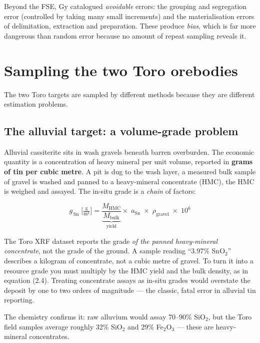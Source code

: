 \documentclass[11pt]{article}
\begin{document}
Beyond the FSE, Gy catalogued \emph{avoidable} errors: the grouping and
segregation error (controlled by taking many small increments) and the
materialisation errors of delimitation, extraction and preparation. These
produce \emph{bias}, which is far more dangerous than random error
because no amount of repeat sampling reveals it.

\section{Sampling the two Toro orebodies}

The two Toro targets are sampled by different methods because they are
different estimation problems.

\subsection{The alluvial target: a volume-grade problem}

Alluvial cassiterite sits in wash gravels beneath barren overburden. The
economic quantity is a concentration of heavy mineral per unit volume,
reported in \textbf{grams of tin per cubic metre}. A pit is dug to the
wash layer, a measured bulk sample of gravel is washed and panned to a
heavy-mineral concentrate (HMC), the HMC is weighed and assayed. The
in-situ grade is a \emph{chain} of factors:

\begin{eqbox}
\[ g_{\,\mathrm{Sn}}\;\Big[\tfrac{\text{g}}{\text{m}^3}\Big]
   = \underbrace{\frac{M_{\text{HMC}}}{M_{\text{bulk}}}}_{\text{yield}}
   \times\; a_{\text{Sn}} \;\times\; \rho_{\text{gravel}}
   \;\times\; 10^{6} \tag{2.4}\]
\end{eqbox}

\begin{pitbox}
The Toro XRF dataset reports the grade \emph{of the panned heavy-mineral
concentrate}, not the grade of the ground. A sample reading ``3.97\%
SnO$_2$'' describes a kilogram of concentrate, not a cubic metre of
gravel. To turn it into a resource grade you must multiply by the HMC
yield and the bulk density, as in equation (2.4). Treating concentrate
assays as in-situ grades would overstate the deposit by one to two orders
of magnitude --- the classic, fatal error in alluvial tin reporting.
\end{pitbox}

The chemistry confirms it: raw alluvium would assay 70--90\% SiO$_2$, but
the Toro field samples average roughly 32\% SiO$_2$ and 29\% Fe$_2$O$_3$
--- these are heavy-mineral concentrates.
\end{document}
